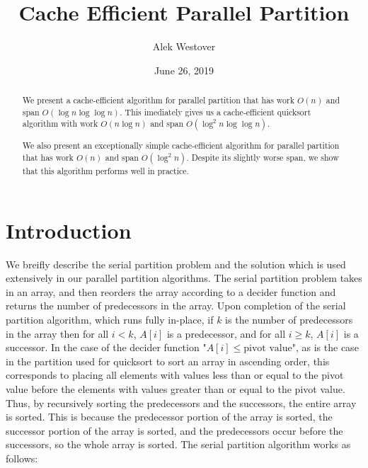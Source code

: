 \documentclass[twocolumn, twoside, 11pt]{article}
\author{\vspace{-2ex}Alek Westover\vspace{-2ex}}
\title{\vspace{-8ex}Cache Efficient Parallel Partition\vspace{-2ex}}
\date{\vspace{-2ex}June 26, 2019\vspace{-2ex}}
\renewcommand{\paragraph}[1]{\vspace{0.09in}\noindent{\bf \boldmath #1.}}
\begin{document}
\maketitle
\begin{abstract}
	We present a cache-efficient algorithm for parallel partition that has work $O(n)$ and span $O(\log n \log\log n)$.
	This imediately gives us a cache-efficient quicksort algorithm with work $O(n\log n)$ and span $O(\log^2 n \log\log n)$.	

	We also present an exceptionally simple cache-efficient algorithm for parallel partition that has work $O(n)$ and span $O(\log^2 n)$. Despite its slightly worse span, we show that this algorithm performs well in practice.
\end{abstract}

\section{Introduction}
\paragraph{Serial Partition Problem}
We breifly describe the serial partition problem and the solution which is used extensively in our parallel partition algorithms. 
The serial partition problem takes in an array, and then reorders the array according to a decider function and returns the number of predecessors in the array.
Upon completion of the serial partition algorithm, which runs fully in-place, if $k$ is the number of predecessors in the array then for all $i < k$, $A[i]$ is a predecessor, and for all $i \ge k$, $A[i]$ is a successor. 
In the case of the decider function "$A[i] \leq \text{pivot value}$", as is the case in the partition used for quicksort to sort an array in ascending order, this corresponds to placing all elements with values less than or equal to the pivot value before the elements with values greater than or equal to the pivot value.
Thus, by recursively sorting the predecessors and the successors, the entire array is sorted. 
This is because the predecessor portion of the array is sorted, the successor portion of the array is sorted, and the predecessors occur before the successors, so the whole array is sorted.
The serial partition algorithm works as follows: 
\end{document}
